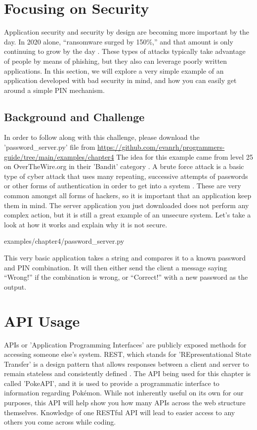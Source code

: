 \documentclass[12pt, oneside, a4paper]{book}
\begin{document}
      \section{Focusing on Security}
      Application security and security by design are becoming more important by the day.
      In 2020 alone, ``ransomware surged by 150\%,'' and that amount is only continuing to grow by the day \autocite{muncasterRansomwareAttacksSoared2021}.
      These types of attacks typically take advantage of people by means of phishing, but they also can leverage poorly written applications.
      In this section, we will explore a very simple example of an application developed with bad security in mind, and how you can easily get around a simple PIN mechanism.

      \subsection{Background and Challenge}
      In order to follow along with this challenge, please download the 'password\_server.py' file from \url{https://github.com/evanrh/programmers-guide/tree/main/examples/chapter4}
      The idea for this example came from level 25 on OverTheWire.org in their 'Bandit' category \autocite{overthewireOverTheWireLevelGoal}.
      A brute force attack is a basic type of cyber attack that uses many repeating, successive attempts of passwords or other forms of authentication in order to get into a system \autocite{universityGrowingCybersecurityThreats2019}.
      These are very common amongst all forms of hackers, so it is important that an application keep them in mind.
      The server application you just downloaded does not perform any complex action, but it is still a great example of an unsecure system.
      Let's take a look at how it works and explain why it is not secure.

      
      {examples/chapter4/password_server.py}

      This very basic application takes a string and compares it to a known password and PIN combination.
      It will then either send the client a message saying ``Wrong!'' if the combination is wrong, or ``Correct!'' with a new password as the output.
      \section{API Usage}
      APIs or 'Application Programming Interfaces' are publicly exposed methods for accessing someone else's system.
      REST, which stands for 'REpresentational State Transfer' is a design pattern that allows responses between a client and server to remain stateless and consistently defined \autocite{hallettPokeAPI}.
      The API being used for this chapter is called 'PokeAPI', and it is used to provide a programmatic interface to information regarding Pokémon.
      While not inherently useful on its own for our purposes, this API will help show you how many APIs across the web structure themselves.
      Knowledge of one RESTful API will lead to easier access to any others you come across while coding.
\end{document}
